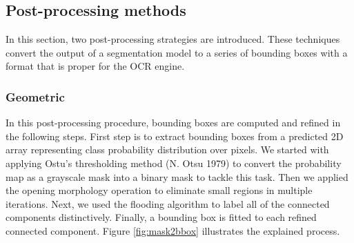 \documentclass[letterpaper]{article} %
\begin{document}
\subsection{Post-processing methods}

In this section, two post-processing strategies are introduced. These techniques convert the output of a segmentation model to a series of bounding boxes with a format that is proper for the OCR engine.

\subsubsection{Geometric}
In this post-processing procedure, bounding boxes are computed and refined in the following steps.
First step is to extract bounding boxes from a predicted 2D array representing class probability distribution over pixels.
We started with applying Ostu’s thresholding method (N. Otsu 1979) to convert the probability map as a grayscale mask into a binary mask to tackle this task.
Then we applied the opening morphology operation to eliminate small regions in multiple iterations.
Next, we used the flooding algorithm to label all of the connected components distinctively. Finally, a bounding box is fitted to each refined connected component. Figure \ref{fig:mask2bbox} illustrates the explained process.
\end{document}
